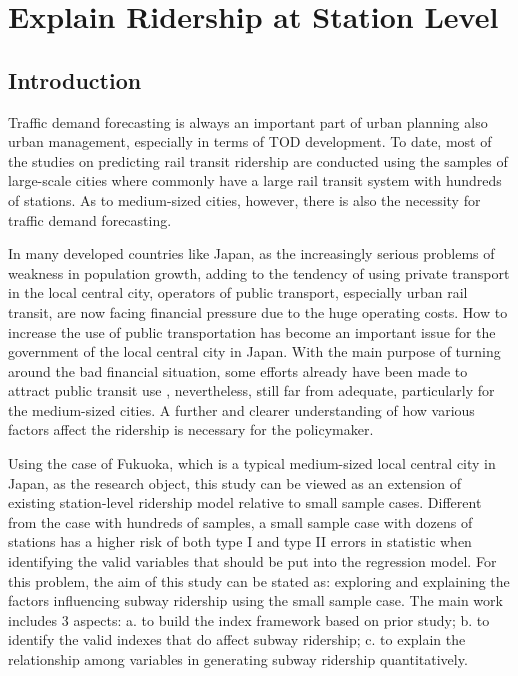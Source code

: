\chapter{Explain Ridership at Station Level}
%
\section{Introduction}

Traffic demand forecasting is always an important part of urban planning also urban management, especially in terms of TOD development. To date, most of the studies on predicting rail transit ridership are conducted using the samples of large-scale cities where commonly have a large rail transit system with hundreds of stations. As to medium-sized cities, however, there is also the necessity for traffic demand forecasting. 

In many developed countries like Japan, as the increasingly serious problems of weakness in population growth, adding to the tendency of using private transport in the local central city, operators of public transport, especially urban rail transit, are now facing financial pressure due to the huge operating costs. How to increase the use of public transportation has become an important issue for the government of the local central city in Japan. With the main purpose of turning around the bad financial situation, some efforts already have been made to attract public transit use \cite{takashi2015study}, nevertheless, still far from adequate, particularly for the medium-sized cities. A further and clearer understanding of how various factors affect the ridership is necessary for the policymaker.


Using the case of Fukuoka, which is a typical medium-sized local central city in Japan, as the research object, this study can be viewed as an extension of existing station-level ridership model relative to small sample cases. Different from the case with hundreds of samples, a small sample case with dozens of stations has a higher risk of both type I and type II errors in statistic when identifying the valid variables that should be put into the regression model. For this problem, the aim of this study can be stated as: exploring and explaining the factors influencing subway ridership using the small sample case. The main work includes 3 aspects: a. to build the index framework based on prior study; b. to identify the valid indexes that do affect subway ridership; c. to explain the relationship among variables in generating subway ridership quantitatively.


